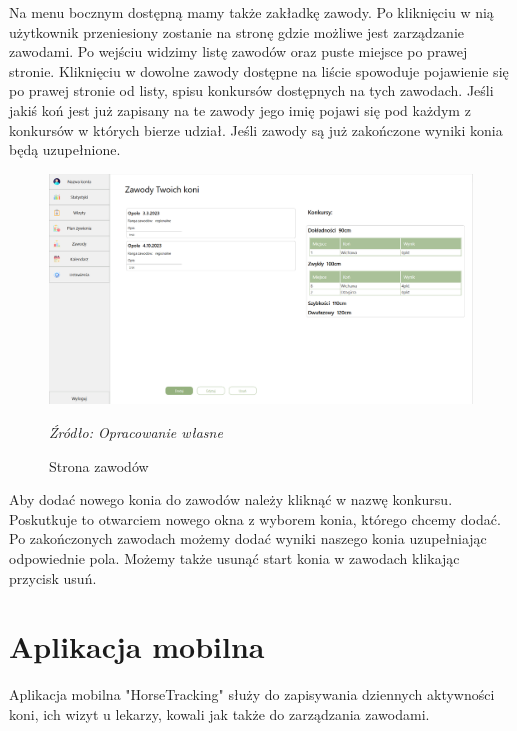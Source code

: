 \documentclass[12pt,oneside]{report}
\begin{document}
Na menu bocznym dostępną mamy także zakładkę zawody. Po kliknięciu w nią użytkownik przeniesiony zostanie na stronę gdzie możliwe jest zarządzanie zawodami. Po wejściu widzimy listę zawodów oraz puste miejsce po prawej stronie. Kliknięciu w dowolne zawody dostępne na liście spowoduje pojawienie się po prawej stronie od listy, spisu konkursów dostępnych na tych zawodach. Jeśli jakiś koń jest już zapisany na te zawody jego imię pojawi się pod każdym z konkursów w których bierze udział. Jeśli zawody są już zakończone wyniki konia będą uzupełnione. 
\begin{figure}[h]
\centering
\includegraphics[scale=0.4]{zawody}
\caption{Strona zawodów}
\textit{Źródło: Opracowanie własne}
\label{StronaZawodow}
\end{figure}
Aby dodać nowego konia do zawodów należy kliknąć w nazwę konkursu. Poskutkuje to otwarciem nowego okna z wyborem konia, którego chcemy dodać. Po zakończonych zawodach możemy dodać wyniki naszego konia uzupełniając odpowiednie pola. Możemy także usunąć start konia w zawodach klikając przycisk usuń.
\newpage
\section{Aplikacja mobilna}
Aplikacja mobilna "HorseTracking" służy do zapisywania dziennych aktywności koni, ich wizyt u lekarzy, kowali jak także do zarządzania zawodami.
\end{document}
